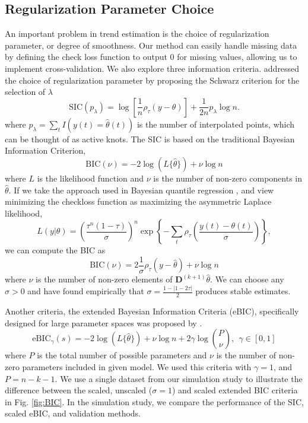 \documentclass[12pt]{article}
\begin{document}
	\subsection{Regularization Parameter Choice}
	\label{sec:lambda_choice}
	An important problem in trend estimation is the choice of regularization parameter, or degree of smoothness. Our method can easily handle missing data by defining the check loss function to output 0 for missing values, allowing us to implement cross-validation. We also explore three information criteria.  \cite{KoenkerNgPortnoy1994} addressed the choice of regularization parameter by proposing the Schwarz criterion for the selection of $\lambda$
	\begin{equation}
	\label{eq:SIC}
	\mbox{SIC}(p_{\lambda}) = \log\left[\frac{1}{n}\rho_{\tau}(y - \theta)\right] + \frac{1}{2n}p_{\lambda}\log n.
	\end{equation}
	where $p_{\lambda} = \sum_t I(y(t) = \widehat{\theta}(t))$ is the number of interpolated points, which can be thought of as active knots. The SIC is based on the traditional Bayesian Information Criterion,
	\begin{equation}
	\mbox{BIC}(\nu) = -2\log(L\{\hat{\theta}\}) + \nu\log n 
	\end{equation}	
	where $L$ is the likelihood function and $\nu$ is the number of non-zero components in $\hat{\theta}$. If we take the approach used in Bayesian quantile regression \citep{yu2001bayesian}, and view minimizing the checkloss function as maximizing the asymmetric Laplace likelihood, \begin{equation}
	L(y|\theta) = \left(\frac{\tau^n(1-\tau)}{\sigma}\right)^n\exp\left\{-\sum_t\rho_\tau\left(\frac{y(t) - \theta(t)}{\sigma}\right)\right\},
	\end{equation} 
	we can compute the BIC as 
	\begin{equation}
	\mbox{BIC}(\nu) = 2\frac{1}{\sigma}\rho_{\tau}(y-\hat{\theta}) + \nu\log n
	\end{equation} 
	where $\nu$ is the number of non-zero elements of $\mathbf{D}^{(k+1)}\hat{\theta}$. We can choose any $\sigma>0$ and have found empirically that $\sigma =  \frac{1-|1-2\tau|}{2}$ produces stable estimates. 
	
	Another criteria, the extended Bayesian Information Criteria (eBIC), specifically designed for large parameter spaces was proposed by \cite{chen2008}. 
	\begin{equation}
	\label{eq:eBIC}
	\mbox{eBIC}_{\gamma}(s) = -2\log(L\{\hat{\theta}\}) + \nu\log n  + 2\gamma\log{P \choose \nu},~~\gamma \in [0,1]
	\end{equation}
	where $P$ is the total number of possible parameters and $\nu$ is the number of non-zero parameters included in given model. We used this criteria with $\gamma = 1$, and $P=n-k-1$. We use a single dataset from our simulation study to illustrate the difference between the scaled, unscaled ($\sigma = 1$) and scaled extended BIC criteria in Fig. \ref{fig:BIC}. In the simulation study, we compare the performance of the SIC, scaled eBIC, and validation methods. 
	
\end{document}
